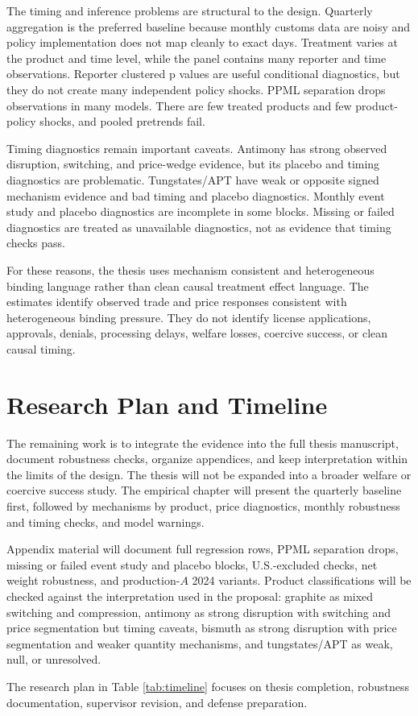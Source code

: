 \documentclass[12pt,a4paper]{article}
\numberwithin{equation}{section}
\begin{document}
The timing and inference problems are structural to the design. Quarterly aggregation is the preferred baseline because monthly customs data are noisy and policy implementation does not map cleanly to exact days. Treatment varies at the product and time level, while the panel contains many reporter and time observations. Reporter clustered p values are useful conditional diagnostics, but they do not create many independent policy shocks. PPML separation drops observations in many models. There are few treated products and few product-policy shocks, and pooled pretrends fail.

Timing diagnostics remain important caveats. Antimony has strong observed disruption, switching, and price-wedge evidence, but its placebo and timing diagnostics are problematic. Tungstates/APT have weak or opposite signed mechanism evidence and bad timing and placebo diagnostics. Monthly event study and placebo diagnostics are incomplete in some blocks. Missing or failed diagnostics are treated as unavailable diagnostics, not as evidence that timing checks pass.

For these reasons, the thesis uses mechanism consistent and heterogeneous binding language rather than clean causal treatment effect language. The estimates identify observed trade and price responses consistent with heterogeneous binding pressure. They do not identify license applications, approvals, denials, processing delays, welfare losses, coercive success, or clean causal timing.

\section{Research Plan and Timeline}

The remaining work is to integrate the evidence into the full thesis manuscript, document robustness checks, organize appendices, and keep interpretation within the limits of the design. The thesis will not be expanded into a broader welfare or coercive success study. The empirical chapter will present the quarterly baseline first, followed by mechanisms by product, price diagnostics, monthly robustness and timing checks, and model warnings.

Appendix material will document full regression rows, PPML separation drops, missing or failed event study and placebo blocks, U.S.-excluded checks, net weight robustness, and production-\(A\) 2024 variants. Product classifications will be checked against the interpretation used in the proposal: graphite as mixed switching and compression, antimony as strong disruption with switching and price segmentation but timing caveats, bismuth as strong disruption with price segmentation and weaker quantity mechanisms, and tungstates/APT as weak, null, or unresolved.

The research plan in Table \ref{tab:timeline} focuses on thesis completion, robustness documentation, supervisor revision, and defense preparation.



\clearpage


\end{document}
